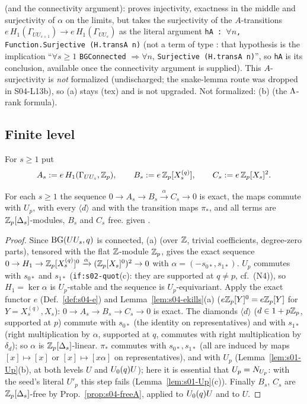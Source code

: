 \begin{theorem}
(and the connectivity argument):  proves injectivity, exactness in the middle and surjectivity of $\alpha$ on the
limits, but takes the surjectivity of the $A$-transitions $e\,H_1(\Gamma_{UU_{s+1}})\to e\,H_1(\Gamma_{UU_s})$ as the literal argument
\texttt{hA : $\forall n$, Function.Surjective (H.transA n)} (not a term of type : that hypothesis is the implication
``$\forall s\ge1$ \texttt{BGConnected} $\Rightarrow\forall n$, \texttt{Surjective (H.transA n)}'', so \texttt{hA} is its conclusion, available once the connectivity argument is supplied). This $A$-surjectivity is \emph{not} formalized (undischarged; the snake-lemma route was dropped in S04-L13b), so
(a) stays \stproved{} (tex) and is not upgraded. Not formalized: (b) (the $\Lambda$-rank formula).
\end{theorem}

\subsection{Finite level}
For $s\ge1$ put
\[A_s:=e\,H_1(\Gamma_{UU_s},\mathbb{Z}_p),\qquad B_s:=e\,\mathbb{Z}_p[X^{(q)}_s],\qquad C_s:=e\,\mathbb{Z}_p[X_s]^{2}.\]
\begin{lemma}\label{lem:s04-ribetfinite}
For each $s\ge1$ the sequence $0\to A_s\to B_s\xrightarrow{\alpha}C_s\to0$ is exact, the maps commute with $U_p$, with every
$\langle d\rangle$ and with the transition maps $\pi_*$, and all terms are $\mathbb{Z}_p[\Delta_s]$-modules, $B_s$ and $C_s$ free.
\stproved{} given .
\end{lemma}
\begin{proof}
Since $\mathrm{BG}(UU_s,q)$ is connected, (a) (over $\mathbb{Z}$, trivial coefficients, degree-zero parts), tensored with the flat
$\mathbb{Z}$-module $\mathbb{Z}_p$, gives the exact sequence $0\to H_1\to\mathbb{Z}_p[X^{(q)}_s]^0\xrightarrow{\alpha}(\mathbb{Z}_p[X_s]^0)^2\to0$ with
$\alpha=(-s_{0*},s_{1*})$. $U_p$ commutes with $s_{0*}$ and $s_{1*}$ (\texttt{if:s02-quot}(c): they are supported at $q\ne p$,
cf.\ (N4)), so $H_1=\ker\alpha$ is $U_p$-stable and the sequence is $U_p$-equivariant. Apply the exact functor $e$
(Def.~\ref{def:s04-e}) and Lemma~\ref{lem:s04-ekills}(a) ($e\mathbb{Z}_p[Y]^0=e\mathbb{Z}_p[Y]$ for $Y=X^{(q)}_s,X_s$): $0\to A_s\to B_s\to C_s\to0$
is exact. The diamonds $\langle d\rangle$ ($d\in1+p\mathbb{Z}_p$, supported at $p$) commute with $s_{0*}$ (the identity on representatives) and
with $s_{1*}$ (right multiplication by $\alpha$, supported at $q$, commutes with right multiplication by $\delta_d$); so $\alpha$ is
$\mathbb{Z}_p[\Delta_s]$-linear. $\pi_*$ commutes with $s_{0*},s_{1*}$ (all are induced by maps $[x]\mapsto[x]$ or $[x]\mapsto[x\alpha]$ on
representatives), and with $U_p$ (Lemma~\ref{lem:s01-Up}(b), at both levels $U$ and $U_0(q)U$); here it is essential that $U_p=N_{U_p}$:
with the seed's literal $U'_p$ this step fails (Lemma~\ref{lem:s01-Up}(c)). Finally $B_s$, $C_s$ are $\mathbb{Z}_p[\Delta_s]$-free by
Prop.~\ref{prop:s04-freeA}, applied to $U_0(q)U$ and to $U$.
\end{proof}


